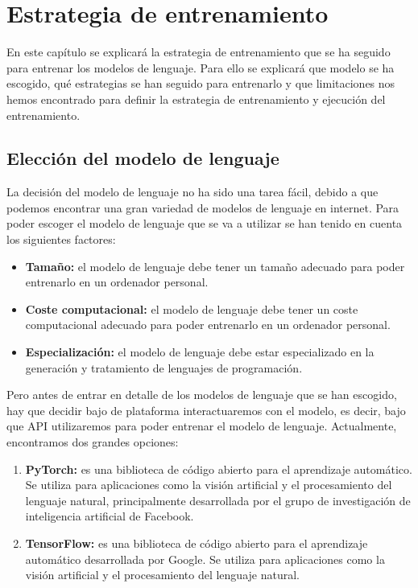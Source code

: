 \chapter{Estrategia de entrenamiento}
\label{cap:estrategia_entrenamiento}


En este capítulo se explicará la estrategia de entrenamiento que se ha seguido para
entrenar los modelos de lenguaje. Para ello se explicará que modelo se ha escogido,
qué estrategias se han seguido para entrenarlo y que limitaciones nos hemos encontrado
para definir la estrategia de entrenamiento y ejecución del entrenamiento.

\section{Elección del modelo de lenguaje}
\label{sec:modelo_lenguaje}


La decisión del modelo de lenguaje no ha sido una tarea fácil, debido a que podemos
encontrar una gran variedad de modelos de lenguaje en internet. Para poder escoger
el modelo de lenguaje que se va a utilizar se han tenido en cuenta los siguientes
factores:

\begin{itemize}
    \item \textbf{Tamaño:} el modelo de lenguaje debe tener un tamaño adecuado
        para poder entrenarlo en un ordenador personal.
    \item \textbf{Coste computacional:} el modelo de lenguaje debe tener un coste
        computacional adecuado para poder entrenarlo en un ordenador personal.
    \item \textbf{Especialización:} el modelo de lenguaje debe estar especializado
        en la generación y tratamiento de lenguajes de programación.
\end{itemize}

Pero antes de entrar en detalle de los modelos de lenguaje que se han escogido,
hay que decidir bajo de plataforma interactuaremos con el modelo, es decir, bajo
que API utilizaremos para poder entrenar el modelo de lenguaje. Actualmente, encontramos
dos grandes opciones:

\begin{enumerate}
    \item \textbf{PyTorch:} es una biblioteca de código abierto para el aprendizaje
        automático. Se utiliza para aplicaciones como la visión artificial y el
        procesamiento del lenguaje natural, principalmente desarrollada por el
        grupo de investigación de inteligencia artificial de Facebook. \cite{PyTorch}
    \item \textbf{TensorFlow:} es una biblioteca de código abierto para el aprendizaje
        automático desarrollada por Google. Se utiliza para aplicaciones como la visión
        artificial y el procesamiento del lenguaje natural. \cite{TensorFlow}
\end{enumerate}

